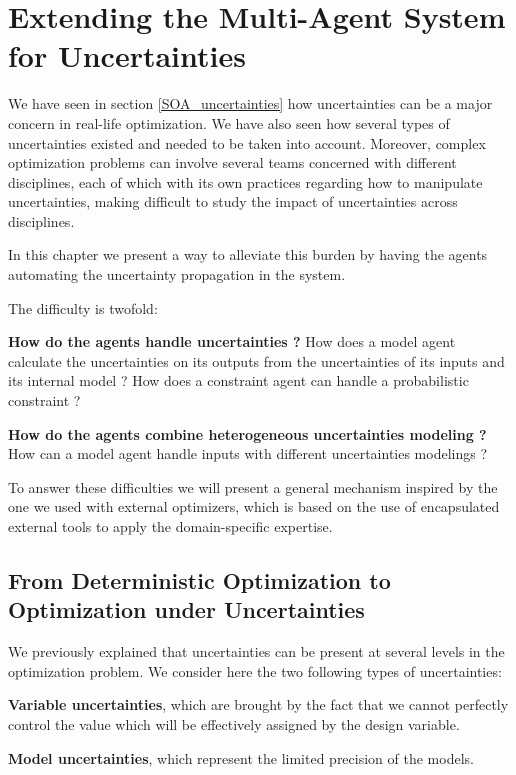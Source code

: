 \chapter{Extending the Multi-Agent System for Uncertainties}\label{mas_uncertainties}

We have seen in section \ref{SOA_uncertainties} how uncertainties can be a major concern in real-life optimization. We have also seen how several types of uncertainties existed and needed to be taken into account. Moreover, complex optimization problems can involve several teams concerned with different disciplines, each of which with its own practices regarding how to manipulate uncertainties, making difficult to study the impact of uncertainties across disciplines.

In this chapter we present a way to alleviate this burden by having the agents automating the uncertainty propagation in the system.

The difficulty is twofold:
\begin{compactitem}
\item \textbf{How do the agents handle uncertainties ?}
How does a model agent calculate the uncertainties on its outputs from the uncertainties of its inputs and its internal model ? How does a constraint agent can handle a probabilistic constraint ?

\item \textbf{How do the agents combine heterogeneous uncertainties modeling ?}
How can a model agent handle inputs with different uncertainties modelings ?
\end{compactitem}

To answer these difficulties we will present a general mechanism inspired by the one we used with external optimizers, which is based on the use of encapsulated external tools to apply the domain-specific expertise.

\section{From Deterministic Optimization to Optimization under Uncertainties}

We previously explained that uncertainties can be present at several levels in the optimization problem. We consider here the two following types of uncertainties:
\begin{compactitem}
\item \textbf{Variable uncertainties}, which are brought by the fact that we cannot perfectly control the value which will be effectively assigned by the design variable.
\item \textbf{Model uncertainties}, which represent the limited precision of the models.
\end{compactitem}

